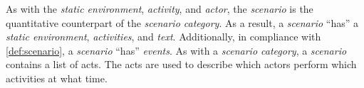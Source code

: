 As with the \textit{static environment}, \textit{activity}, and \textit{actor}, the \textit{scenario} is the quantitative counterpart of the \textit{scenario category}. As a result, a \textit{scenario} ``has'' a \textit{static environment}, \textit{activities}, and \textit{text}. Additionally, in compliance with \cref{def:scenario}, a \textit{scenario} ``has'' \textit{events}. As with a \textit{scenario category}, a \textit{scenario} contains a list of acts.
The acts are used to describe which actors perform which activities at what time.
